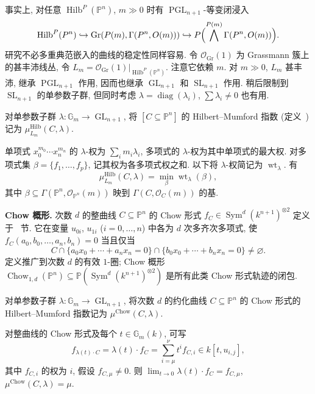 事实上, 对任意 $\operatorname{Hilb}^P(\mathbb P^n)$, $m\gg0$ 时有 $\operatorname{PGL}_{n+1}$-等变闭浸入
\[
\operatorname{Hilb}^P(\mathbb P^n)\hookrightarrow\operatorname{Gr}(P(m),\Gamma(\mathbb P^n,\mathcal O(m)))
\hookrightarrow\mathbb P\Bigl(\bigwedge^{P(m)}\Gamma(\mathbb P^n,\mathcal O(m))\Bigr).
\]
研究不必多重典范嵌入的曲线的稳定性同样容易. 令 $\mathcal O_{\operatorname{Gr}}(1)$ 为 Grassmann 簇上的甚丰沛线丛, 令 $L_m=\mathcal O_{\operatorname{Gr}}(1)|_{\operatorname{Hilb}^P(\mathbb P^n)}$. 注意它依赖 $m$. 对 $m\gg0$, $L_m$ 甚丰沛, 继承 $\operatorname{PGL}_{n+1}$ 作用, 因而也继承 $\operatorname{GL}_{n+1}$ 和 $\operatorname{SL}_{n+1}$ 作用. 稍后限制到 $\operatorname{SL}_{n+1}$ 的单参数子群, 但同时考虑 $\lambda=\operatorname{diag}(\lambda_i)$, $\sum\lambda_i\ne0$ 也有用.
\begin{definition}\label{src:6.8.2}
对单参数子群 $\lambda:\mathbb G_m\to\operatorname{GL}_{n+1}$, 将 $[C\subseteq\mathbb P^n]$ 的 Hilbert--Mumford 指数 (定义~) 记为 $\mu_{L_m}^{\mathrm{Hilb}}(C,\allowbreak \lambda)$.
\end{definition}
单项式 $x_0^{m_0}\cdots x_n^{m_n}$ 的 $\lambda$-权为 $\sum_i m_i\lambda_i$, 多项式的 $\lambda$-权为其中单项式的最大权. 对多项式集 $\beta=\{f_1,\allowbreak \ldots,\allowbreak f_p\}$, 记其权为各多项式权之和. 以下将 $\lambda$-权简记为 $\operatorname{wt}_\lambda$. 有
\begin{equation}\label{src:6.8.3}
\mu_{L_m}^{\mathrm{Hilb}}(C,\lambda)=\min_\beta\operatorname{wt}_\lambda(\beta),
\end{equation}
其中 $\beta\subseteq\Gamma(\mathbb P^n,\allowbreak \mathcal O_{\mathbb P^n}(m))$ 映到 $\Gamma(C,\allowbreak \mathcal O_C(m))$ 的基.

\noindent\textbf{Chow 概形.} 次数 $d$ 的整曲线 $C\subseteq\mathbb P^n$ 的 Chow 形式 $f_C\in\operatorname{Sym}^d(k^{n+1})^{\otimes2}$ 定义于~ 节. 它在变量 $u_{0i}$, $u_{1i}$ ($i=0,\allowbreak \ldots,\allowbreak n$) 中各为 $d$ 次多齐次多项式, 使 $f_C(a_0,\allowbreak b_0,\allowbreak \ldots,\allowbreak a_n,\allowbreak b_n)=0$ 当且仅当
\[
C\cap\{a_0x_0+\cdots+a_nx_n=0\}\cap\{b_0x_0+\cdots+b_nx_n=0\}\ne\varnothing.
\]
定义推广到次数 $d$ 的有效 $1$-圈; Chow 概形 $\operatorname{Chow}_{1,\allowbreak d}(\mathbb P^n)\subseteq\mathbb P(\operatorname{Sym}^d(k^{n+1})^{\otimes2})$ 是所有此类 Chow 形式轨迹的闭包.
\begin{definition}\label{src:6.8.4}
对单参数子群 $\lambda:\mathbb G_m\to\operatorname{GL}_{n+1}$, 将次数 $d$ 的约化曲线 $C\subseteq\mathbb P^n$ 的 Chow 形式的 Hilbert--Mumford 指数记为 $\mu^{\mathrm{Chow}}(C,\allowbreak \lambda)$.
\end{definition}
对整曲线的 Chow 形式及每个 $t\in\mathbb G_m(k)$, 可写
\[
f_{\lambda(t)\cdot C}=\lambda(t)\cdot f_C=\sum_{i=\mu}^\nu t^if_{C,i}\in k[t,u_{i,j}],
\]
其中 $f_{C,\allowbreak i}$ 的权为 $i$, 假设 $f_{C,\allowbreak \mu}\ne0$. 则 $\lim_{t\to0}\lambda(t)\cdot f_C=f_{C,\allowbreak \mu}$, $\mu^{\mathrm{Chow}}(C,\allowbreak \lambda)=\mu$.


